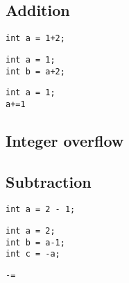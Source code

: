 

\subsection{Addition}

\begin{verbatim}
int a = 1+2;
\end{verbatim}

\begin{verbatim}
int a = 1;
int b = a+2;
\end{verbatim}

\begin{verbatim}
int a = 1;
a+=1
\end{verbatim}

\subsection{Integer overflow}


\subsection{Subtraction}

\begin{verbatim}
int a = 2 - 1;
\end{verbatim}

\begin{verbatim}
int a = 2;
int b = a-1;
int c = -a;
\end{verbatim}

\begin{verbatim}
-=
\end{verbatim}




